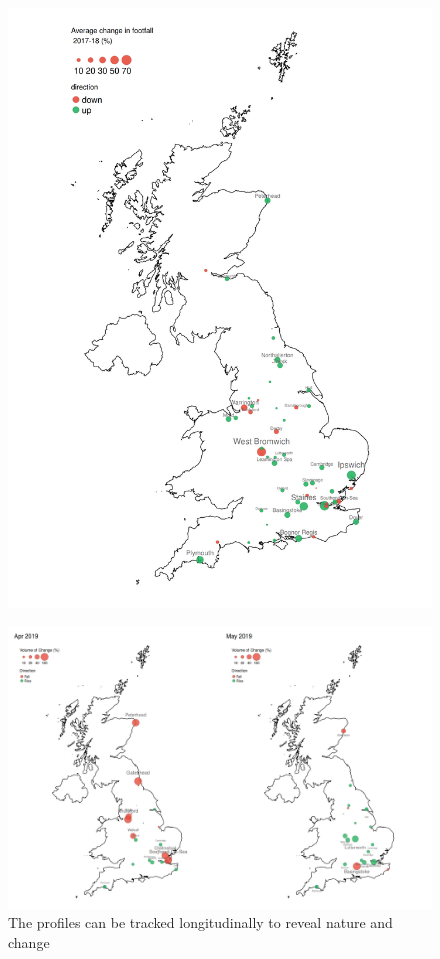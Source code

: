 \begin{figure}
  \includegraphics[trim={0 0 0 0},clip]{images/applications-cities-rank.png}
  \caption{}
  \label{}
\end{figure}

\lipsum[1]

\begin{figure}
  \includegraphics[trim={0 12 0 0},clip]{images/applications-city-indices.png}
  \caption{The profiles can be tracked longitudinally to reveal nature and change}
  \label{}
\end{figure}

